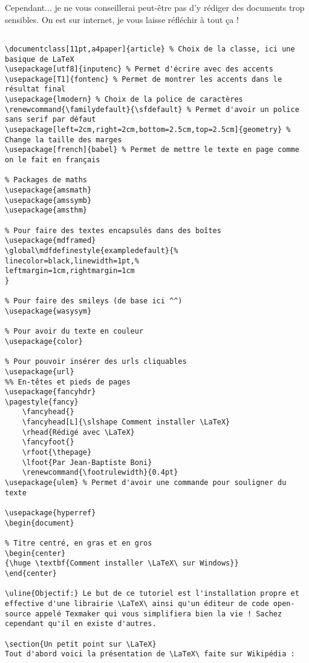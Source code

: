\documentclass[11pt,a4paper]{article} %
\renewcommand{\familydefault}{\sfdefault} %
\renewcommand{\footrulewidth}{0.4pt}
\begin{document}
Cependant... je ne vous conseillerai peut-être pas d'y rédiger des documents trop sensibles. On est sur internet, je vous laisse réfléchir à tout ça !

\clearpage

\begin{Verbatim}[breaklines=true]

\documentclass[11pt,a4paper]{article} % Choix de la classe, ici une basique de LaTeX
\usepackage[utf8]{inputenc} % Permet d'écrire avec des accents
\usepackage[T1]{fontenc} % Permet de montrer les accents dans le résultat final
\usepackage{lmodern} % Choix de la police de caractères
\renewcommand{\familydefault}{\sfdefault} % Permet d'avoir un police sans serif par défaut
\usepackage[left=2cm,right=2cm,bottom=2.5cm,top=2.5cm]{geometry} % Change la taille des marges
\usepackage[french]{babel} % Permet de mettre le texte en page comme on le fait en français

% Packages de maths
\usepackage{amsmath}
\usepackage{amssymb}
\usepackage{amsthm}

% Pour faire des textes encapsulés dans des boîtes
\usepackage{mdframed}
\global\mdfdefinestyle{exampledefault}{%
linecolor=black,linewidth=1pt,%
leftmargin=1cm,rightmargin=1cm
}

% Pour faire des smileys (de base ici ^^)
\usepackage{wasysym}

% Pour avoir du texte en couleur
\usepackage{color}

% Pour pouvoir insérer des urls cliquables
\usepackage{url}
%% En-têtes et pieds de pages
\usepackage{fancyhdr}
\pagestyle{fancy}
	\fancyhead{}
	\fancyhead[L]{\slshape Comment installer \LaTeX}
	\rhead{Rédigé avec \LaTeX}
	\fancyfoot{}
	\rfoot{\thepage}
	\lfoot{Par Jean-Baptiste Boni}
	\renewcommand{\footrulewidth}{0.4pt}
\usepackage{ulem} % Permet d'avoir une commande pour souligner du texte

\usepackage{hyperref}
\begin{document}

% Titre centré, en gras et en gros
\begin{center}
{\huge \textbf{Comment installer \LaTeX\ sur Windows}}
\end{center}

\uline{Objectif:} Le but de ce tutoriel est l'installation propre et effective d'une librairie \LaTeX\ ainsi qu'un éditeur de code open-source appelé Texmaker qui vous simplifiera bien la vie ! Sachez cependant qu'il en existe d'autres.

\section{Un petit point sur \LaTeX}
Tout d'abord voici la présentation de \LaTeX\ faite sur Wikipédia :


\end{Verbatim}
\end{document}
